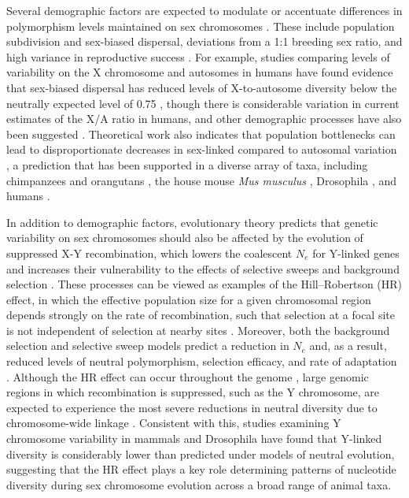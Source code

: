 \documentclass[9pt,twocolumn,twoside]{gsajnl}
\begin{document}
Several demographic factors are expected to modulate or accentuate differences in polymorphism levels maintained on sex chromosomes \citep{ellegren2009}. These include population subdivision and sex-biased dispersal, deviations from a 1:1 breeding sex ratio, and high variance in reproductive success \citep{caballero1995,charlesworth2001,laporte2002,pool2007}. For example, studies comparing levels of variability on the X chromosome and autosomes in humans have found evidence that sex-biased dispersal has reduced levels of X-to-autosome diversity below the neutrally expected level of 0.75 \citep{keinan2009}, though there is considerable variation in current estimates of the X/A ratio in humans, and other demographic processes have also been suggested \citep{hammer2010,bustamante2009}. Theoretical work also indicates that population bottlenecks can lead to disproportionate decreases in sex-linked compared to autosomal variation \citep{pool2007}, a prediction that has been supported in a diverse array of taxa, including chimpanzees and orangutans \citep{kaessmann2001,fischer2006}, the house mouse \textit{Mus musculus} \citep{baines2007}, Drosophila \citep{andolfatto2001}, and humans \citep{keinan2009}.

In addition to demographic factors, evolutionary theory predicts that genetic variability on sex chromosomes should also be affected by the evolution of suppressed X-Y recombination, which lowers the coalescent $N_{e}$ for Y-linked genes and increases their vulnerability to the effects of selective sweeps \citep{smith1974hitch,aquadro1994} and background selection \citep{charlesworth1996background,charlesworth1994effect}. These processes can be viewed as examples of the Hill–Robertson (HR) effect, in which the effective population size for a given chromosomal region depends strongly on the rate of recombination, such that selection at a focal site is not independent of selection at nearby sites \citep{hill1966HReffect}. Moreover, both the background selection and selective sweep models predict a reduction in $N_{e}$ and, as a result, reduced levels of neutral polymorphism, selection efficacy, and rate of adaptation \citep{comeron2008}. Although the HR effect can occur throughout the genome \citep{mcvean2000}, large genomic regions in which recombination is suppressed, such as the Y chromosome, are expected to experience the most severe reductions in neutral diversity due to chromosome-wide linkage \citep{charlesworth1996CB,charlesworth2000degeneration,bachtrog2013NRG}. Consistent with this, studies examining Y chromosome variability in mammals \citep{hellborg2004,Wilsonsayres2014} and Drosophila \citep{mcallister1999,bachtrog2000} have found that Y-linked diversity is considerably lower than predicted under models of neutral evolution, suggesting that the HR effect plays a key role determining patterns of nucleotide diversity during sex chromosome evolution across a broad range of animal taxa. 
\end{document}
